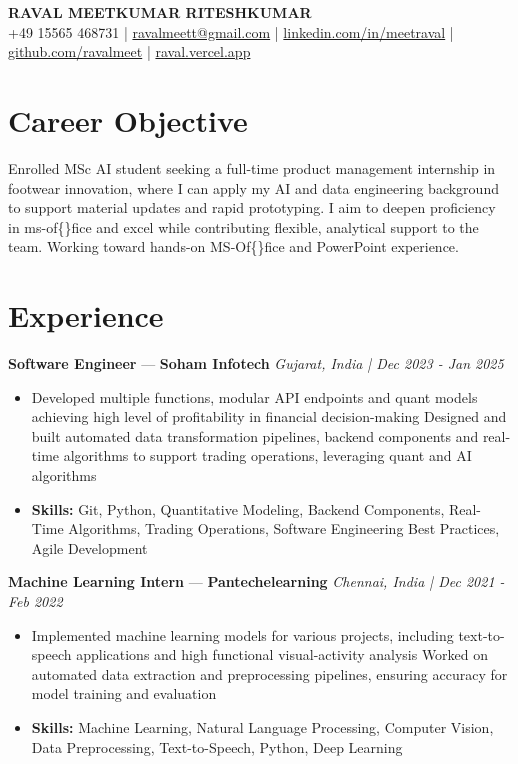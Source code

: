 \documentclass[a4paper,10pt]{article}
\begin{document}
\begin{center}
  {\Large\bfseries RAVAL MEETKUMAR RITESHKUMAR}\\[2pt]
  {\small +49 15565 468731 \;|\; \href{mailto:ravalmeett@gmail.com}{ravalmeett@gmail.com} \;|\; \href{https://www.linkedin.com/in/meetraval/}{linkedin.com/in/meetraval} \;|\; \href{https://github.com/ravalmeet}{github.com/ravalmeet} \;|\; \href{https://raval.vercel.app/}{raval.vercel.app}}
\end{center}
\vspace{-3pt}

\section*{Career Objective}
Enrolled MSc AI student seeking a full-time product management internship in footwear innovation, where I can apply my AI and data engineering background to support material updates and rapid prototyping. I aim to deepen proficiency in ms-of\{\}fice and excel while contributing flexible, analytical support to the team. Working toward hands-on MS-Of\{\}fice and PowerPoint experience.\par

\section*{Experience}
\textbf{Software Engineer} — \textbf{Soham Infotech} \hfill \textit{Gujarat, India \;|\; Dec 2023 - Jan 2025}\par
\vspace{1pt}
\begin{itemize}
  \item Developed multiple functions, modular API endpoints and quant models achieving high level of profitability in financial decision-making Designed and built automated data transformation pipelines, backend components and real-time algorithms to support trading operations, leveraging quant and AI algorithms
  \item \textbf{Skills:} Git, Python, Quantitative Modeling, Backend Components, Real-Time Algorithms, Trading Operations, Software Engineering Best Practices, Agile Development
\end{itemize}
\vspace{3pt}
\textbf{Machine Learning Intern} — \textbf{Pantechelearning} \hfill \textit{Chennai, India \;|\; Dec 2021 - Feb 2022}\par
\vspace{1pt}
\begin{itemize}
  \item Implemented machine learning models for various projects, including text-to-speech applications and high functional visual-activity analysis Worked on automated data extraction and preprocessing pipelines, ensuring accuracy for model training and evaluation
  \item \textbf{Skills:} Machine Learning, Natural Language Processing, Computer Vision, Data Preprocessing, Text-to-Speech, Python, Deep Learning
\end{itemize}
\end{document}

